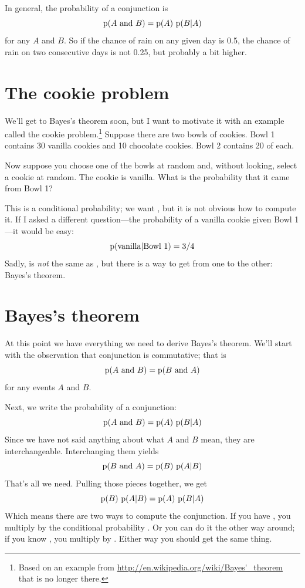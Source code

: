 \documentclass[12pt]{book}
\begin{document}
In general, the probability of a conjunction is
%
\[ \mathrm{p}(A ~\mathrm{and}~ B) = \mathrm{p}(A)~\mathrm{p}(B|A) \]
%
for any $A$ and $B$.  So if the chance of rain on any given day
is 0.5, the chance of rain on two consecutive days is not
0.25, but probably a bit higher.


\section{The cookie problem}

We'll get to Bayes's theorem soon, but I want to motivate it with an
example called the cookie problem.\footnote{Based on an example from
  \url{http://en.wikipedia.org/wiki/Bayes'_theorem} that is no longer
  there.}  Suppose there are two bowls of cookies.  Bowl 1 contains
  30 vanilla cookies and 10 chocolate cookies.  Bowl 2 contains 20 of
  each.

Now suppose you choose one of the bowls at random and, without
looking, select a cookie at random.  The cookie is vanilla.  What is
the probability that it came from Bowl 1?

This is a conditional probability; we want , but it is not obvious how to compute it.  If I asked a
different question---the probability of a vanilla cookie given Bowl
1---it would be easy:
%
\[ \mathrm{p}(\mbox{vanilla} | \mbox{Bowl 1}) = 3/4 \]
%
Sadly,  is {\em not} the same as , but there
is a way to get from one to the other: Bayes's theorem.


\section{Bayes's theorem}

At this point we have everything we need to derive Bayes's theorem.
We'll start with the observation that conjunction is commutative; that is
%
\[ \mathrm{p}(A ~\mathrm{and}~ B) = \mathrm{p}(B ~\mathrm{and}~ A) \]
%
for any events $A$ and $B$.

Next, we write the probability of a conjunction:
%
\[ \mathrm{p}(A ~\mathrm{and}~ B) = \mathrm{p}(A)~\mathrm{p}(B|A) \]
%
Since we have not said anything about what $A$ and $B$ mean, they
are interchangeable.  Interchanging them yields
%
\[ \mathrm{p}(B ~\mathrm{and}~ A) = \mathrm{p}(B)~\mathrm{p}(A|B) \]
%
That's all we need.  Pulling those pieces together, we get
%
\[ \mathrm{p}(B)~\mathrm{p}(A|B) = \mathrm{p}(A)~\mathrm{p}(B|A) \]
%
Which means there are two ways to compute the conjunction.
If you have , you multiply by the conditional
probability .  Or you can do it the other way around; if you
know , you multiply by .  Either way you should get
the same thing.
\end{document}
